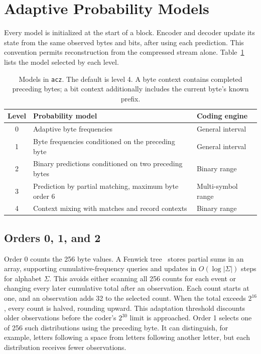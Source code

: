 \documentclass[10pt,letterpaper]{article}
\newcommand{\acz}{\texttt{acz}}
\begin{document}
\section{Adaptive Probability Models}\label{sec:models}
Every model is initialized at the start of a block. Encoder and decoder update its state from the same observed bytes and bits, after using each prediction. This convention permits reconstruction from the compressed stream alone. Table~\ref{tab:models} lists the model selected by each level.

\begin{table}[htbp]
\centering
\caption{Models in \acz{}. The default is level 4. A byte context contains completed preceding bytes; a bit context additionally includes the current byte's known prefix.}\label{tab:models}
\medskip
\begin{tabular}{@{}cll@{}}
\toprule
Level & Probability model & Coding engine\\
\midrule
0 & Adaptive byte frequencies & General interval\\
1 & Byte frequencies conditioned on the preceding byte & General interval\\
2 & Binary predictions conditioned on two preceding bytes & Binary range\\
3 & Prediction by partial matching, maximum byte order 6 & Multi-symbol range\\
4 & Context mixing with matches and record contexts & Binary range\\
\bottomrule
\end{tabular}
\end{table}

\subsection{Orders 0, 1, and 2}
Order 0 counts the 256 byte values. A Fenwick tree~\cite{fenwick} stores partial sums in an array, supporting cumulative-frequency queries and updates in $O(\log \lvert\Sigma\rvert)$ steps for alphabet $\Sigma$. This avoids either scanning all 256 counts for each event or changing every later cumulative total after an observation. Each count starts at one, and an observation adds 32 to the selected count. When the total exceeds $2^{16}$, every count is halved, rounding upward. This adaptation threshold discounts older observations before the coder's $2^{30}$ limit is approached. Order 1 selects one of 256 such distributions using the preceding byte. It can distinguish, for example, letters following a space from letters following another letter, but each distribution receives fewer observations.
\end{document}
